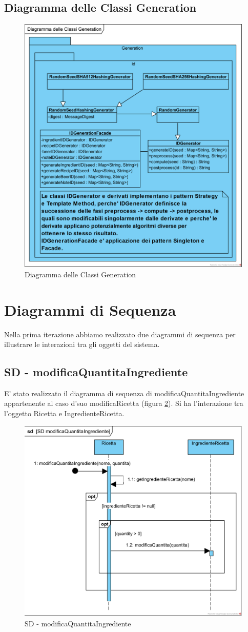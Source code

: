 \documentclass[a4paper,12pt]{report}
\begin{document}
		\subsection{Diagramma delle Classi Generation}
			\begin{figure}[!h]
				\centering
				\includegraphics[width=0.3\linewidth]{image/Diagramma-delle-Classi-Generation.png}
				\caption{Diagramma delle Classi Generation}\label{fig:1}
			\end{figure}  
			
    \newpage
      	\section{Diagrammi di Sequenza} 
	Nella prima iterazione abbiamo realizzato due diagrammi di sequenza per illustrare le interazioni tra gli oggetti del sistema.
		\subsection{SD - modificaQuantitaIngrediente}
			E' stato realizzato il diagramma di sequenza di modificaQuantitaIngrediente appartenente al caso d'suo modificaRicetta (figura \ref{fig:SD-modificaQuantitaIngrediente}).
			Si ha l'interazione tra l'oggetto Ricetta e IngredienteRicetta.
			\begin{figure}[!h]
				\centering
				\includegraphics[width=0.7\linewidth]{image/SD-modificaQuantitaIngrediente.png}
				\caption{SD - modificaQuantitaIngrediente}\label{fig:SD-modificaQuantitaIngrediente}
			\end{figure}	
		\newpage	
\end{document}
